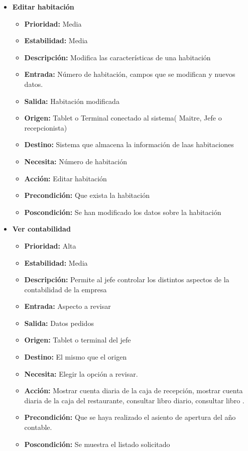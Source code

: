 \documentclass[spanish,a4paper,11pt, twoside]{report}	%
\begin{document}
\begin{itemize}
\begin{itemize}
		\end{itemize}%

		\item \textbf{Editar habitación} 

		\begin{itemize}

			\item \textbf{Prioridad: }Media
			\item \textbf{Estabilidad: }Media
			\item \textbf{Descripción: }Modifica las características de una habitación
			\item \textbf{Entrada: }Número de habitación, campos que se modifican y nuevos datos.
			\item \textbf{Salida: }Habitación modificada
			\item \textbf{Origen: }Tablet o Terminal conectado al sistema( Maitre, Jefe o recepcionista)
			\item \textbf{Destino: }Sistema que almacena la información de laas habitaciones
			\item \textbf{Necesita: }Número de habitación
			\item \textbf{Acción: }Editar habitación
			\item \textbf{Precondición: }Que exista la habitación
			\item \textbf{Poscondición: }Se han modificado los datos sobre la habitación

		\end{itemize}%

		\item \textbf{Ver contabilidad} %

		\begin{itemize}

			\item \textbf{Prioridad: }Alta
			\item \textbf{Estabilidad: }Media
			\item \textbf{Descripción: }Permite al jefe controlar los distintos aspectos de la contabilidad de la empresa
			\item \textbf{Entrada: } Aspecto a revisar
			\item \textbf{Salida: } Datos pedidos
			\item \textbf{Origen: } Tablet o terminal del jefe
			\item \textbf{Destino: } El mismo que el origen
			\item \textbf{Necesita: } Elegir la opción a revisar.
			\item \textbf{Acción: }Mostrar cuenta diaria de la caja de recepción, mostrar cuenta diaria de la caja del restaurante, consultar libro diario, consultar libro .
			\item \textbf{Precondición: } Que se haya realizado el asiento de apertura del año contable.
			\item \textbf{Poscondición: } Se muestra el listado solicitado

		\end{itemize}%

\end{itemize}%
\end{document}
